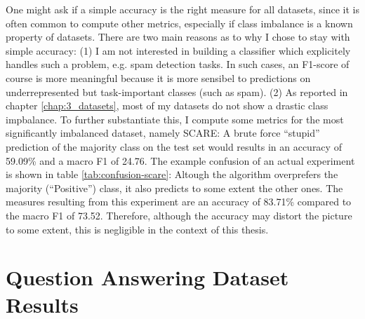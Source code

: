 One might ask if a simple accuracy is the right measure for all datasets, since
it is often common to compute other metrics, especially if class imbalance is
a known property of datasets. There are two main reasons as to why I chose to
stay with simple accuracy: (1) I am not interested in building a classifier
which explicitely handles such a problem, e.g. spam detection tasks. In such
cases, an F1-score of course is more meaningful because it is more sensibel to
predictions on underrepresented but task-important classes (such as spam). (2)
As reported in chapter \ref{chap:3_datasets}, most of my datasets do not show a
drastic class impbalance. To further substantiate this, I compute some metrics
for the most significantly imbalanced dataset, namely SCARE: A brute force
``stupid'' prediction of the majority class on the test set would results in an
accuracy of 59.09\% and a macro F1 of 24.76. The example confusion of an actual
experiment is shown in table \ref{tab:confusion-scare}: Altough the algorithm
overprefers the majority (``Positive'') class, it also predicts to some extent
the other ones. The measures resulting from this experiment are an accuracy of
83.71\% compared to the macro F1 of 73.52. Therefore, although the accuracy may
distort the picture to some extent, this is negligible in the context of this
thesis.




\section{Question Answering Dataset Results}
\label{sec:qa-results}


